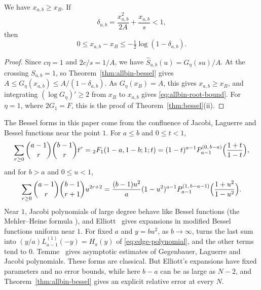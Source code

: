 \begin{corollary}\label{cor:allbin-root-bound}
We have $x_{a,b}\ge x_B$. If
\[
 \delta_{a,b}=\frac{x_{a,b}^2}{2A}+\frac{x_{a,b}}s<1,
\]
then
\begin{equation}\label{eq:allbin-root-bound}
 0\le x_{a,b}-x_B\le-\tfrac12\log(1-\delta_{a,b}).
\end{equation}
\end{corollary}
\begin{proof}
Since $c\eta=1$ and $2c/s=1/A$, we have $\widehat S_{a,b}(u)=G_\eta(su)/A$. At
the crossing $S_{a,b}=1$, so Theorem~\ref{thm:allbin-bessel} gives
$A\le G_\eta(x_{a,b})\le A/(1-\delta_{a,b})$. As $G_\eta(x_B)=A$, this gives
$x_{a,b}\ge x_B$, and integrating $(\log G_\eta)'\ge2$ from $x_B$ to $x_{a,b}$
gives \eqref{eq:allbin-root-bound}. For $\eta=1$, where $2G_1=F$, this is the
proof of Theorem~\ref{thm:bessel}(ii).
\end{proof}

\begin{remark}\label{rem:jacobi}
The Bessel forms in this paper come from the confluence of Jacobi, Laguerre
and Bessel functions near the point $1$. For $a\le b$ and $0\le t<1$,
\[
 \sum_{r\ge0}\binom{a-1}{r}\binom{b-1}{r}t^r
 ={}_2F_1(1-a,1-b;1;t)
 =(1-t)^{a-1}P_{a-1}^{(0,\,b-a)}\Bigl(\frac{1+t}{1-t}\Bigr),
\]
and for $b>a$ and $0\le u<1$,
\[
 \sum_{r\ge0}\binom{a-1}{r}\binom{b-1}{r+1}u^{2r+2}
 =\frac{(b-1)u^2}{a}(1-u^2)^{a-1}P_{a-1}^{(1,\,b-a-1)}\Bigl(\frac{1+u^2}{1-u^2}\Bigr).
\]
Near $1$, Jacobi polynomials of large degree behave like Bessel functions
(the Mehler--Heine formula \cite[Eq.~18.11.5]{dlmf}), and Elliott~\cite{elliott1971}
gives expansions in modified Bessel functions uniform near $1$. For fixed $a$
and $y=bu^2$, as $b\to\infty$, \cite[Eq.~18.7.21]{dlmf} turns the last sum into
$(y/a)L_{a-1}^{(1)}(-y)=H_a(y)$ of \eqref{eq:edge-polynomial}, and the other
terms tend to $0$. Temme~\cite{temme1990} gives asymptotic estimates of
Gegenbauer, Laguerre and Jacobi polynomials. These forms are classical. But Elliott's expansions
have fixed parameters and no error bounds, while here $b-a$ can be as large as
$N-2$, and Theorem~\ref{thm:allbin-bessel} gives an explicit relative error at
every $N$.
\end{remark}

